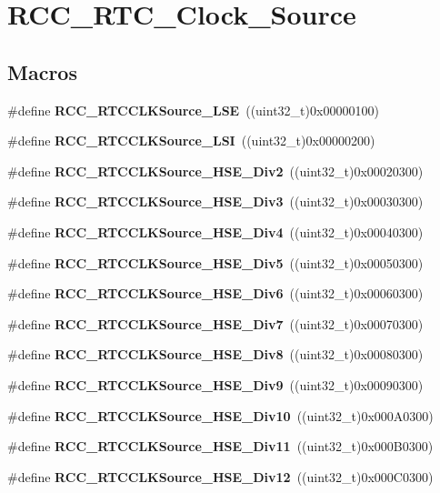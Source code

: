 \section{R\+C\+C\+\_\+\+R\+T\+C\+\_\+\+Clock\+\_\+\+Source}
\label{group__RCC__RTC__Clock__Source}
\subsection*{Macros}
\begin{DoxyCompactItemize}
\item 
\#define \textbf{ R\+C\+C\+\_\+\+R\+T\+C\+C\+L\+K\+Source\+\_\+\+L\+SE}~((uint32\+\_\+t)0x00000100)
\item 
\#define \textbf{ R\+C\+C\+\_\+\+R\+T\+C\+C\+L\+K\+Source\+\_\+\+L\+SI}~((uint32\+\_\+t)0x00000200)
\item 
\#define \textbf{ R\+C\+C\+\_\+\+R\+T\+C\+C\+L\+K\+Source\+\_\+\+H\+S\+E\+\_\+\+Div2}~((uint32\+\_\+t)0x00020300)
\item 
\#define \textbf{ R\+C\+C\+\_\+\+R\+T\+C\+C\+L\+K\+Source\+\_\+\+H\+S\+E\+\_\+\+Div3}~((uint32\+\_\+t)0x00030300)
\item 
\#define \textbf{ R\+C\+C\+\_\+\+R\+T\+C\+C\+L\+K\+Source\+\_\+\+H\+S\+E\+\_\+\+Div4}~((uint32\+\_\+t)0x00040300)
\item 
\#define \textbf{ R\+C\+C\+\_\+\+R\+T\+C\+C\+L\+K\+Source\+\_\+\+H\+S\+E\+\_\+\+Div5}~((uint32\+\_\+t)0x00050300)
\item 
\#define \textbf{ R\+C\+C\+\_\+\+R\+T\+C\+C\+L\+K\+Source\+\_\+\+H\+S\+E\+\_\+\+Div6}~((uint32\+\_\+t)0x00060300)
\item 
\#define \textbf{ R\+C\+C\+\_\+\+R\+T\+C\+C\+L\+K\+Source\+\_\+\+H\+S\+E\+\_\+\+Div7}~((uint32\+\_\+t)0x00070300)
\item 
\#define \textbf{ R\+C\+C\+\_\+\+R\+T\+C\+C\+L\+K\+Source\+\_\+\+H\+S\+E\+\_\+\+Div8}~((uint32\+\_\+t)0x00080300)
\item 
\#define \textbf{ R\+C\+C\+\_\+\+R\+T\+C\+C\+L\+K\+Source\+\_\+\+H\+S\+E\+\_\+\+Div9}~((uint32\+\_\+t)0x00090300)
\item 
\#define \textbf{ R\+C\+C\+\_\+\+R\+T\+C\+C\+L\+K\+Source\+\_\+\+H\+S\+E\+\_\+\+Div10}~((uint32\+\_\+t)0x000\+A0300)
\item 
\#define \textbf{ R\+C\+C\+\_\+\+R\+T\+C\+C\+L\+K\+Source\+\_\+\+H\+S\+E\+\_\+\+Div11}~((uint32\+\_\+t)0x000\+B0300)
\item 
\#define \textbf{ R\+C\+C\+\_\+\+R\+T\+C\+C\+L\+K\+Source\+\_\+\+H\+S\+E\+\_\+\+Div12}~((uint32\+\_\+t)0x000\+C0300)

\end{DoxyCompactItemize}
